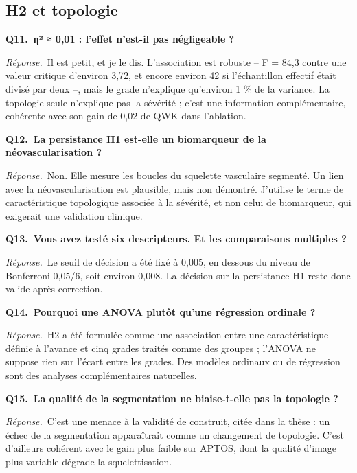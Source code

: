 \documentclass[11pt,a4paper]{article}
\begin{document}
\subsection*{H2 et topologie}
\textbf{Q11.~η² ≈ 0,01 : l'effet n'est-il pas négligeable ?}\par\nopagebreak
\textit{Réponse.}~Il est petit, et je le dis. L'association est robuste – F = 84,3 contre une valeur critique d'environ 3,72, et encore environ 42 si l'échantillon effectif était divisé par deux –, mais le grade n'explique qu'environ 1 \% de la variance. La topologie seule n'explique pas la sévérité ; c'est une information complémentaire, cohérente avec son gain de 0,02 de QWK dans l'ablation.\par\medskip
\textbf{Q12.~La persistance H1 est-elle un biomarqueur de la néovascularisation ?}\par\nopagebreak
\textit{Réponse.}~Non. Elle mesure les boucles du squelette vasculaire segmenté. Un lien avec la néovascularisation est plausible, mais non démontré. J'utilise le terme de caractéristique topologique associée à la sévérité, et non celui de biomarqueur, qui exigerait une validation clinique.\par\medskip
\textbf{Q13.~Vous avez testé six descripteurs. Et les comparaisons multiples ?}\par\nopagebreak
\textit{Réponse.}~Le seuil de décision a été fixé à 0,005, en dessous du niveau de Bonferroni 0,05/6, soit environ 0,008. La décision sur la persistance H1 reste donc valide après correction.\par\medskip
\textbf{Q14.~Pourquoi une ANOVA plutôt qu'une régression ordinale ?}\par\nopagebreak
\textit{Réponse.}~H2 a été formulée comme une association entre une caractéristique définie à l'avance et cinq grades traités comme des groupes ; l'ANOVA ne suppose rien sur l'écart entre les grades. Des modèles ordinaux ou de régression sont des analyses complémentaires naturelles.\par\medskip
\textbf{Q15.~La qualité de la segmentation ne biaise-t-elle pas la topologie ?}\par\nopagebreak
\textit{Réponse.}~C'est une menace à la validité de construit, citée dans la thèse : un échec de la segmentation apparaîtrait comme un changement de topologie. C'est d'ailleurs cohérent avec le gain plus faible sur APTOS, dont la qualité d'image plus variable dégrade la squelettisation.\par\medskip
\end{document}
